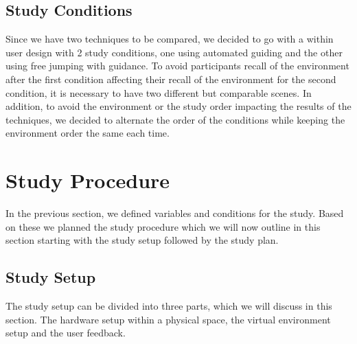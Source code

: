 \subsection{Study Conditions}
\label{subsection DPUS VC: Study Conditions}
Since we have two techniques to be compared, we decided to go with a within user design with 2 study conditions, one using automated guiding and the other using free jumping with guidance. To avoid participants recall of the environment after the first condition affecting their recall of the environment for the second condition, it is necessary to have two different but comparable scenes. In addition, to avoid the environment or the study order impacting the results of the techniques, we decided to alternate the order of the conditions while keeping the environment order the same each time.  
 
\section{Study Procedure}
\label{section DPUS: Study Procedure}
In the previous section, we defined variables and conditions for the study. Based on these we planned the study procedure which we will now outline in this section starting with the study setup followed by the study plan.

\subsection{Study Setup}
\label{subsection DPUS SP: Study Setup}
The study setup can be divided into three parts, which we will discuss in this section. The hardware setup within a physical space, the virtual environment setup and the user feedback.

